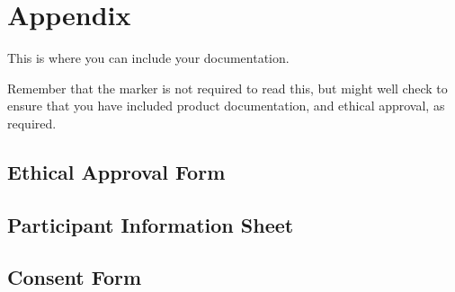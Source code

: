 \section{Appendix}

This is where you can include your documentation.

Remember that the marker is not required to read this, but might well check to ensure that you have included product documentation, and ethical approval, as required.

\subsection{Ethical Approval Form}


\subsection{Participant Information Sheet }


\subsection{Consent Form }



\clearpage

